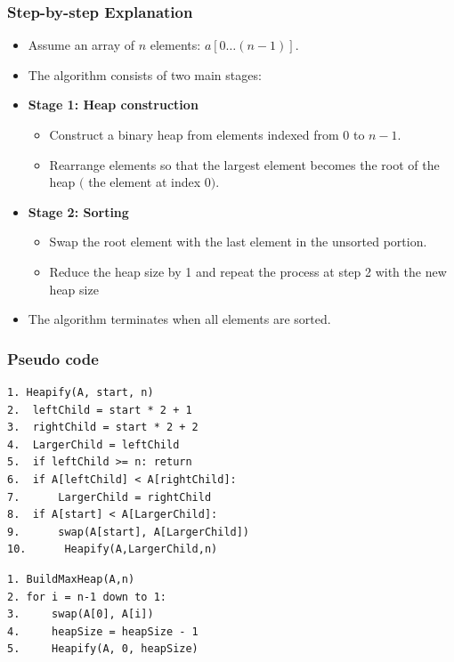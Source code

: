 \subsubsection{Step-by-step Explanation}
\begin{itemize}
    \item Assume an array of $n$ elements: $a[0 \dots (n-1)]$.
    \item The algorithm consists of two main stages:
    
    \item \textbf{Stage 1: Heap construction}
    \begin{itemize}
        \item Construct a binary heap from elements indexed from $0$ to $n-1$.
        \item Rearrange elements so that the largest element becomes the root of the heap $($ the element at index 0$ )$.
    \end{itemize}

    \item \textbf{Stage 2: Sorting}
    \begin{itemize}
        \item Swap the root element with the last element in the unsorted portion.
        \item Reduce the heap size by 1 and repeat the process at step 2 with the new heap size
    \end{itemize}

    \item The algorithm terminates when all elements are sorted.
\end{itemize}

\subsubsection{Pseudo code}

\begin{verbatim}
1. Heapify(A, start, n)
2.  leftChild = start * 2 + 1
3.  rightChild = start * 2 + 2
4.  LargerChild = leftChild
5.  if leftChild >= n: return
6.  if A[leftChild] < A[rightChild]:
7.      LargerChild = rightChild
8.  if A[start] < A[LargerChild]:
9.      swap(A[start], A[LargerChild])
10.      Heapify(A,LargerChild,n) 
\end{verbatim}

\begin{verbatim}
1. BuildMaxHeap(A,n)
2. for i = n-1 down to 1:
3.     swap(A[0], A[i])
4.     heapSize = heapSize - 1
5.     Heapify(A, 0, heapSize)
\end{verbatim}



